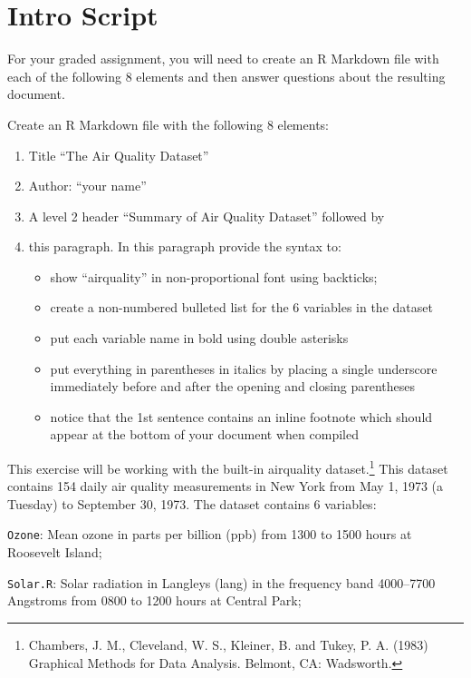 \documentclass[
]{book}
\providecommand{\tightlist}{%
  \setlength{\itemsep}{0pt}\setlength{\parskip}{0pt}}
\begin{document}
\hypertarget{intro-script-2}{%
\section{Intro Script}\label{intro-script-2}}

For your graded assignment, you will need to create an R Markdown file with each of the following 8 elements and then answer questions about the resulting document.

Create an R Markdown file with the following 8 elements:

\begin{enumerate}
\def\labelenumi{\arabic{enumi}.}
\item
  Title ``The Air Quality Dataset''
\item
  Author: ``your name''
\item
  A level 2 header ``Summary of Air Quality Dataset'' followed by
\item
  this paragraph. In this paragraph provide the syntax to:

  \begin{itemize}
  \tightlist
  \item
    show ``airquality'' in non-proportional font using backticks;
  \item
    create a non-numbered bulleted list for the 6 variables in the dataset
  \item
    put each variable name in bold using double asterisks
  \item
    put everything in parentheses in italics by placing a single underscore immediately before and after the opening and closing parentheses
  \item
    notice that the 1st sentence contains an inline footnote which should appear at the bottom of your document when compiled
  \end{itemize}
\end{enumerate}

This exercise will be working with the built-in airquality dataset.\footnote{Chambers, J. M., Cleveland, W. S., Kleiner, B. and Tukey, P. A. (1983) Graphical Methods for Data Analysis. Belmont, CA: Wadsworth.} This dataset contains 154 daily air quality measurements in New York from May 1, 1973 (a Tuesday) to September 30, 1973. The dataset contains 6 variables:

\texttt{Ozone}: Mean ozone in parts per billion (ppb) from 1300 to 1500 hours at Roosevelt Island;

\texttt{Solar.R}: Solar radiation in Langleys (lang) in the frequency band 4000--7700 Angstroms from 0800 to 1200 hours at Central Park;
\end{document}
